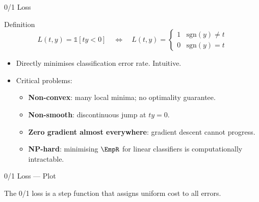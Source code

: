 \begin{frame}{0/1 Loss}
  \begin{block}{Definition}
    \[
      L(t,y) = \mathbb{1}[ty < 0]
      \quad\Leftrightarrow\quad
      L(t,y)=\begin{cases} 1 & \text{sgn}(y)\neq t \\ 0 & \text{sgn}(y)=t \end{cases}
    \]
  \end{block}

  \begin{itemize}
    \item Directly minimises classification error rate. Intuitive.
    \item \alert{Critical problems}:
      \begin{itemize}
        \item \textbf{Non-convex}: many local minima; no optimality guarantee.
        \item \textbf{Non-smooth}: discontinuous jump at $ty=0$.
        \item \textbf{Zero gradient almost everywhere}: gradient descent cannot progress.
        \item \textbf{NP-hard}: minimising $\EmpR$ for linear classifiers is computationally intractable.
      \end{itemize}
  \end{itemize}
\end{frame}

\begin{frame}{0/1 Loss — Plot}
  \begin{center}
  \end{center}
  {\small The 0/1 loss is a step function that assigns uniform cost to all errors.}
\end{frame}

